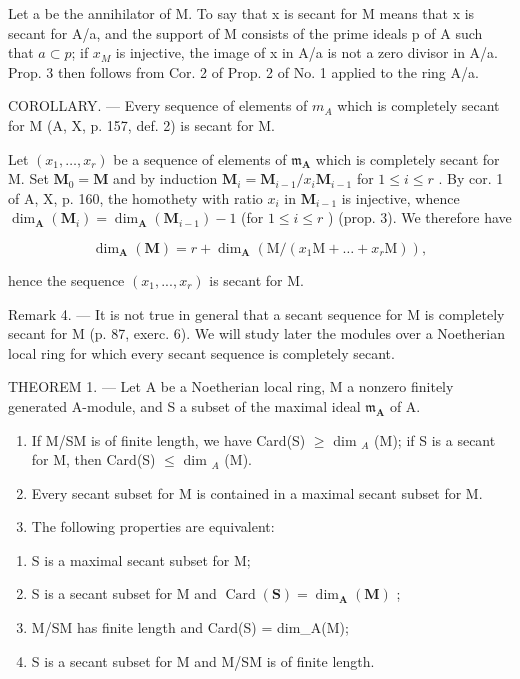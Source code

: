 Let a be the annihilator of M. To say that x is secant for M means that x is secant for A/a, and the support of M consists of the prime ideals p of A such that \(a \subset p\); if \(x_{M}\) is injective, the image of x in A/a is not a zero divisor in A/a. Prop. 3 then follows from Cor. 2 of Prop. 2 of No. 1 applied to the ring A/a.

COROLLARY. --- Every sequence of elements of \(m_{A}\) which is completely secant for M (A, X, p. 157, def. 2) is secant for M.

Let \((x_{1},\ldots ,x_{r})\) be a sequence of elements of \(\mathfrak{m}_{\mathbf{A}}\) which is completely secant for M. Set \(\mathbf{M}_0 = \mathbf{M}\) and by induction \(\mathbf{M}_i = \mathbf{M}_{i - 1} / x_i\mathbf{M}_{i - 1}\) for \(1\leqslant i\leqslant r\) . By cor. 1 of A, X, p. 160, the homothety with ratio \(x_{i}\) in \(\mathbf{M}_{i - 1}\) is injective, whence \(\dim_{\mathbf{A}}(\mathbf{M}_i) = \dim_{\mathbf{A}}(\mathbf{M}_{i - 1}) - 1\) (for \(1\leqslant i\leqslant r\) ) (prop. 3). We therefore have

\[
\dim_ {\mathbf {A}} (\mathbf {M}) = r + \dim_ {\mathbf {A}} \left(\mathrm{M} / (x _ {1} \mathrm{M} + \dots + x _ {r} \mathrm{M})\right),
\]

hence the sequence \((x_{1},...,x_{r})\) is secant for M.

Remark 4. --- It is not true in general that a secant sequence for M is completely secant for M (p. 87, exerc. 6). We will study later the modules over a Noetherian local ring for which every secant sequence is completely secant.

THEOREM 1. --- Let A be a Noetherian local ring, M a nonzero finitely generated A-module, and S a subset of the maximal ideal \(\mathfrak{m}_{\mathbf{A}}\) of A.

\begin{enumerate}
\def\labelenumi{\alph{enumi})}
\item
  If M/SM is of finite length, we have Card(S) \(\geqslant\) dim \(_{A}\) (M); if S is a secant for M, then Card(S) \(\leqslant\) dim \(_{A}\) (M).
\item
  Every secant subset for M is contained in a maximal secant subset for M.
\item
  The following properties are equivalent:
\end{enumerate}

\begin{enumerate}
\def\labelenumi{(\roman{enumi})}
\item
  S is a maximal secant subset for M;
\item
  S is a secant subset for M and \(\operatorname{Card}(\mathbf{S}) = \dim_{\mathbf{A}}(\mathbf{M})\) ;
\item
  M/SM has finite length and Card(S) = dim\_A(M);
\item
  S is a secant subset for M and M/SM is of finite length.
\end{enumerate}

